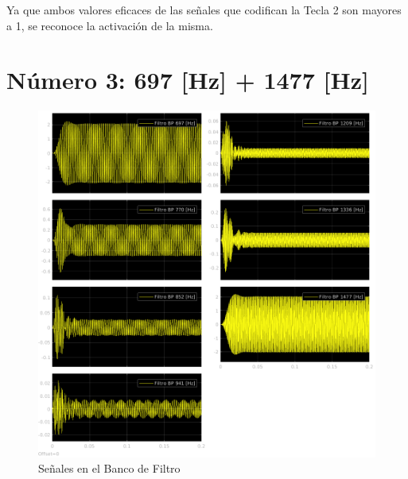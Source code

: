 Ya que ambos valores eficaces de las señales que codifican la Tecla 2 son mayores a 1, se reconoce la activación de la misma.


\section{Número 3: 697 [Hz] + 1477 [Hz]}
\label{sec:signal_3}
\begin{figure}[H]
  \centering
  \includegraphics[width=\linewidth]{images/simulacion/fallas/bank/3.png}
  \caption{Señales en el Banco de Filtro}
  \label{fig:num_3_bank}
\end{figure}

